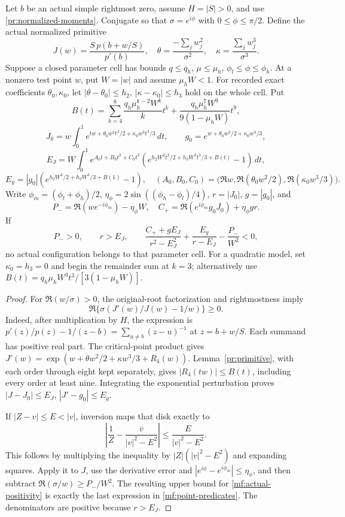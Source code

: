 \begin{lemma}\label{mf:point-obstruction}
Let $b$ be an actual simple rightmost zero, assume $H=|S|>0$,
and use \eqref{pr:normalized-moments}. Conjugate so that
$\sigma=e^{i\phi}$ with $0\le\phi\le\pi/2$.
Define the actual normalized primitive
\[
 J(w)=\frac{S\,p(b+w/S)}{p'(b)},\quad
 \theta=\frac{-\sum_jw_j^2}{\sigma^2},\quad
 \kappa=\frac{\sum_jw_j^3}{\sigma^3}.
\]
Suppose a closed parameter cell has bounds $q\le q_h$,
$\mu\le\mu_h$, $\phi_l\le\phi\le\phi_h$.
At a nonzero test point $w$, put $W=|w|$ and assume $\mu_hW<1$.
For recorded exact coefficients $\theta_0,\kappa_0$, let
$|\theta-\theta_0|\le h_2$, $|\kappa-\kappa_0|\le h_3$
hold on the whole cell. Put
\[
 B(t)=\sum_{k=4}^8\frac{q_h\mu_h^{k-2}W^k}{k}t^k
       +\frac{q_h\mu_h^7W^9}{9(1-\mu_hW)}t^9,
\]
\[
 J_0=w\int_0^1e^{tw+\theta_0w^2t^2/2+\kappa_0w^3t^3/3}\,dt,
 \qquad g_0=e^{w+\theta_0w^2/2+\kappa_0w^3/3},
\]
\[
 E_J=W\int_0^1 e^{A_0t+B_0t^2+C_0t^3}
     \left(e^{h_2W^2t^2/2+h_3W^3t^3/3+B(t)}-1\right)\,dt,
\]
\[
 E_g=|g_0|\left(e^{h_2W^2/2+h_3W^3/3+B(1)}-1\right),
 \quad
 (A_0,B_0,C_0)=
 \bigl(\Re w,\Re(\theta_0w^2/2),\Re(\kappa_0w^3/3)\bigr).
\]
Write $\phi_m=(\phi_l+\phi_h)/2$,
$\eta_\phi=2\sin((\phi_h-\phi_l)/4)$, $r=|J_0|$, $g=|g_0|$,
and
\[
 P_-=\Re(we^{-i\phi_m})-\eta_\phi W,\quad
 C_+=\Re(e^{i\phi_m}g_0\overline{J_0})+\eta_\phi gr.
\]
If
\begin{equation}\label{mf:point-predicates}
 P_->0,\qquad r>E_J,\qquad
 \frac{C_++gE_J}{r^2-E_J^2}
       +\frac{E_g}{r-E_J}-\frac{P_-}{W^2}<0,
\end{equation}
no actual configuration belongs to that parameter cell.
For a quadratic model, set $\kappa_0=h_3=0$ and begin the
remainder sum at $k=3$; alternatively use
$B(t)=q_h\mu_hW^3t^3/[3(1-\mu_hW)]$.
\end{lemma}

\begin{proof}
For $\Re(w/\sigma)>0$, the original-root factorization
and rightmostness imply
\begin{equation}\label{mf:actual-positivity}
 \Re\{\sigma(J'(w)/J(w)-1/w)\}\ge0.
\end{equation}
Indeed, after multiplication by $H$, the expression is
$p'(z)/p(z)-1/(z-b)=\sum_{u\ne b}(z-u)^{-1}$ at
$z=b+w/S$. Each summand has positive real part.
The critical-point product gives
$J'(w)=\exp(w+\theta w^2/2+\kappa w^3/3+R_4(w))$.
Lemma~\ref{pr:primitive}, with each order through eight kept
separately, gives $|R_4(tw)|\le B(t)$, including every order
at least nine. Integrating the exponential
perturbation proves $|J-J_0|\le E_J$, $|J'-g_0|\le E_g$.

If $|Z-v|\le E<|v|$, inversion maps that disk exactly to
\[
 \left|\frac1Z-\frac{\overline v}{|v|^2-E^2}\right|
 \le\frac{E}{|v|^2-E^2}.
\]
This follows by multiplying the inequality by
$|Z|(|v|^2-E^2)$ and expanding squares.
Apply it to $J$, use the derivative error and
$|e^{i\phi}-e^{i\phi_m}|\le\eta_\phi$, and then subtract
$\Re(\sigma/w)\ge P_-/W^2$.
The resulting upper bound for \eqref{mf:actual-positivity}
is exactly the last expression in \eqref{mf:point-predicates}.
The denominators are positive because $r>E_J$.
\end{proof}

